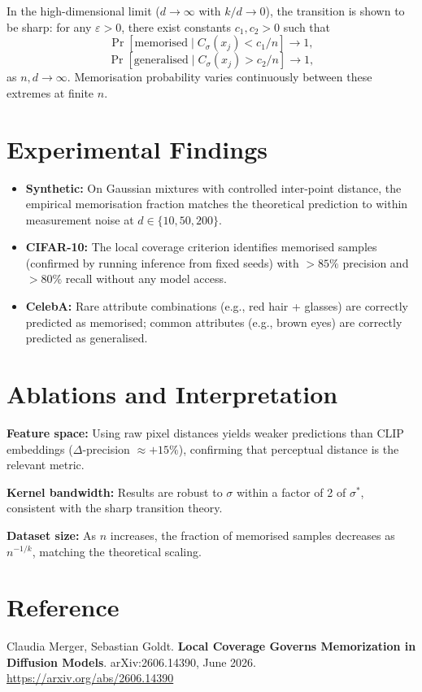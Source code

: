 \documentclass[10pt,twocolumn]{article}
\begin{document}
In the high-dimensional limit ($d\to\infty$ with $k/d\to0$), the
transition is shown to be sharp: for any $\varepsilon>0$, there exist
constants $c_1,c_2>0$ such that
\[
\Pr[\text{memorised} \mid C_\sigma(x_j) < c_1/n] \to 1,
\]
\[
\Pr[\text{generalised} \mid C_\sigma(x_j) > c_2/n] \to 1,
\]
as $n,d\to\infty$. Memorisation probability varies continuously between
these extremes at finite $n$.

\section{Experimental Findings}

\begin{itemize}[itemsep=2pt,parsep=0pt]
  \item \textbf{Synthetic:} On Gaussian mixtures with controlled
    inter-point distance, the empirical memorisation fraction matches
    the theoretical prediction to within measurement noise at
    $d\in\{10,50,200\}$.
  \item \textbf{CIFAR-10:} The local coverage criterion identifies
    memorised samples (confirmed by running inference from fixed seeds)
    with $>85\%$ precision and $>80\%$ recall without any model access.
  \item \textbf{CelebA:} Rare attribute combinations (e.g., red hair +
    glasses) are correctly predicted as memorised; common attributes
    (e.g., brown eyes) are correctly predicted as generalised.
\end{itemize}

\section{Ablations and Interpretation}

\textbf{Feature space:} Using raw pixel distances yields weaker
predictions than CLIP embeddings ($\Delta$-precision $\approx +15\%$),
confirming that perceptual distance is the relevant metric.

\textbf{Kernel bandwidth:} Results are robust to $\sigma$ within a
factor of 2 of $\sigma^*$, consistent with the sharp transition theory.

\textbf{Dataset size:} As $n$ increases, the fraction of memorised
samples decreases as $n^{-1/k}$, matching the theoretical scaling.

\section*{Reference}

Claudia Merger, Sebastian Goldt.
\textbf{Local Coverage Governs Memorization in Diffusion Models}.
arXiv:2606.14390, June 2026.
\url{https://arxiv.org/abs/2606.14390}
\end{document}
